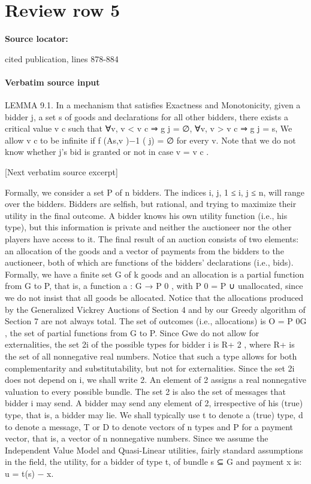 \documentclass[10pt]{article}
\begin{document}
\section*{Review row 5}
\textbf{Source locator:} {\footnotesize\raggedright cited publication, lines 878-\allowbreak{}884\par}
\paragraph{Verbatim source input}
\begin{ReviewVerbatim}
LEMMA 9.1. In a mechanism that satisfies Exactness and Monotonicity, given
a bidder j, a set s of goods and declarations for all other bidders, there exists a
critical value v c such that
∀v, v < v c ⇒ g j = ∅,
∀v, v > v c ⇒ g j = s,
We allow v c to be infinite if f (As,v )−1 ( j) = ∅ for every v. Note that we do not
know whether j’s bid is granted or not in case v = v c .

[Next verbatim source excerpt]

Formally, we consider a set P of n bidders. The indices i, j, 1 ≤ i, j ≤ n, will
range over the bidders. Bidders are selfish, but rational, and trying to maximize their
utility in the final outcome. A bidder knows his own utility function (i.e., his type),
but this information is private and neither the auctioneer nor the other players have
access to it. The final result of an auction consists of two elements: an allocation
of the goods and a vector of payments from the bidders to the auctioneer, both of
which are functions of the bidders’ declarations (i.e., bids). Formally, we have a
finite set G of k goods and an allocation is a partial function from G to P, that is, a
function a : G → P 0 , with P 0 = P ∪ {unallocated}, since we do not insist that all
goods be allocated. Notice that the allocations produced by the Generalized Vickrey
Auctions of Section 4 and by our Greedy algorithm of Section 7 are not always
total. The set of outcomes (i.e., allocations) is O = P 0G , the set of partial functions
from G to P. Since Gwe do not allow for externalities, the set 2i of the possible types
for bidder i is R+ 2 , where R+ is the set of all nonnegative real numbers. Notice
that such a type allows for both complementarity and substitutability, but not for
externalities. Since the set 2i does not depend on i, we shall write 2. An element
of 2 assigns a real nonnegative valuation to every possible bundle. The set 2 is
also the set of messages that bidder i may send. A bidder may send any element of
2, irrespective of his (true) type, that is, a bidder may lie. We shall typically use t
to denote a (true) type, d to denote a message, T or D to denote vectors of n types
and P for a payment vector, that is, a vector of n nonnegative numbers.
Since we assume the Independent Value Model and Quasi-Linear utilities, fairly
standard assumptions in the field, the utility, for a bidder of type t, of bundle s ⊆ G
and payment x is:
u = t(s) − x.


\end{ReviewVerbatim}
\end{document}
